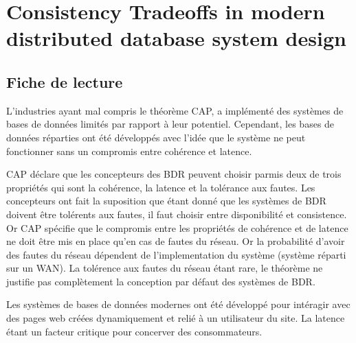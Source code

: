 \section{Consistency Tradeoffs in modern distributed database system design}

\subsection {Fiche de lecture}

L'industries ayant mal compris le théorème CAP, a implémenté des systèmes de bases de données limités par rapport à leur potentiel.
Cependant, les bases de données réparties ont été développés avec l'idée que le système ne peut fonctionner sans un compromis entre cohérence et latence.


CAP déclare que les concepteurs des BDR peuvent choisir parmis deux de trois propriétés qui sont la cohérence, la latence et la tolérance aux fautes.
Les concepteurs ont fait la suposition que étant donné que les systèmes de BDR doivent être tolérents aux fautes, il faut choisir entre disponibilité et consistence.
Or CAP spécifie que le compromis entre les propriétés de cohérence et de latence ne doit être mis en place qu'en cas de fautes du réseau. Or la probabilité d'avoir des fautes du réseau dépendent de l'implementation du système (système réparti sur un WAN). La tolérence aux fautes du réseau étant rare, le théorème ne justifie pas complètement la conception par défaut des systèmes de BDR.


Les systèmes de bases de données modernes ont été développé pour intéragir avec des pages web créées dynamiquement et relié à un utilisateur du site. La latence étant un facteur critique pour concerver des consommateurs.
